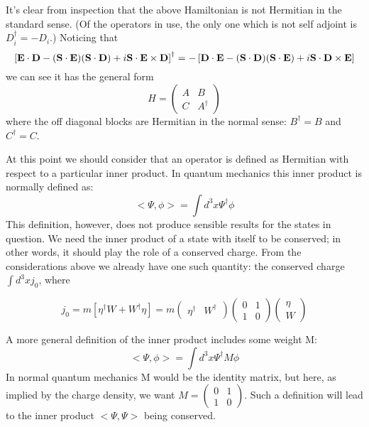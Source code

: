 It's clear from inspection that the above Hamiltonian is not Hermitian in the standard sense.  (Of the operators in use, the only one which is not self adjoint is $D_i^\dagger = - D_i$.)  Noticing that 
\[
	\left [ \mathbf{E} \cdot \mathbf{D} - (\mathbf{S} \cdot \mathbf{E})( \mathbf{S} \cdot \mathbf{D}) + i \mathbf{S} \cdot \mathbf{E} \times \mathbf{D} \right]^\dagger 
		= - \left [ \mathbf{D} \cdot \mathbf{E} - (\mathbf{S} \cdot \mathbf{D}) (\mathbf{S} \cdot \mathbf{E}) + i \mathbf{S} \cdot \mathbf{D} \times \mathbf{E} \right ] 
\]
we can see it has the general form 
\[
	H = 
\begin{pmatrix}
	A	&	B	\\
	C	&	A^\dagger
\end{pmatrix}
\]
where the off diagonal blocks are Hermitian in the normal sense: $B^\dagger = B$ and $C^\dagger=C$.

At this point we should consider that an operator is defined as Hermitian with respect to a particular inner product.  In quantum mechanics this inner product is normally defined as:
\[	<\Psi, \phi> = \int d^3x \Psi^\dagger \phi	\]
This definition, however, does not produce sensible results for the states in question.  We need the inner product of a state with itself to be conserved; in other words, it should play the role of a conserved charge.  From the considerations above we already have one such quantity: the conserved charge $\int d^3x j_0$, where 

\[	
	j_0 = m [\eta^\dagger W + W^\dagger \eta] 
		= 	m \begin{pmatrix} \eta^\dagger & W^\dagger \end{pmatrix}
			\begin{pmatrix} 0 & 1 \\ 1 & 0 \end{pmatrix}
			\begin{pmatrix} \eta \\ W \end{pmatrix}
\]

A more general definition of the inner product includes some weight M: 
\[	<\Psi, \phi> = \int d^3x \Psi^\dagger M \phi	\]
In normal quantum mechanics M would be the identity matrix, but here, as implied by the charge density, we want $M=\begin{pmatrix} 0 & 1 \\ 1 & 0 \end{pmatrix}$.  Such a definition will lead to the inner product $<\Psi, \Psi>$ being conserved.

